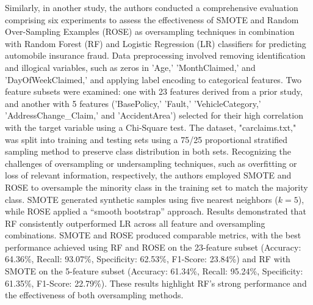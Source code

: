 \documentclass[twoside,11pt]{article}
\begin{document}
Similarly, in another study, the authors \cite{Salmi2022} conducted a comprehensive evaluation comprising six experiments to assess the effectiveness of SMOTE and Random Over-Sampling Examples (ROSE) as oversampling techniques in combination with Random Forest (RF) and Logistic Regression (LR) classifiers for predicting automobile insurance fraud. Data preprocessing involved removing identification and illogical variables, such as zeros in 'Age,' 'MonthClaimed,' and 'DayOfWeekClaimed,' and applying label encoding to categorical features. Two feature subsets were examined: one with 23 features derived from a prior study, and another with 5 features ('BasePolicy,' 'Fault,' 'VehicleCategory,' 'AddressChange\_Claim,' and 'AccidentArea') selected for their high correlation with the target variable using a Chi-Square test. The dataset, "carclaims.txt," was split into training and testing sets using a 75/25 proportional stratified sampling method to preserve class distribution in both sets. Recognizing the challenges of oversampling or undersampling techniques, such as overfitting or loss of relevant information, respectively, the authors employed SMOTE and ROSE to oversample the minority class in the training set to match the majority class. SMOTE generated synthetic samples using five nearest neighbors (\(k = 5\)), while ROSE applied a “smooth bootstrap” approach. Results demonstrated that RF consistently outperformed LR across all feature and oversampling combinations. SMOTE and ROSE produced comparable metrics, with the best performance achieved using RF and ROSE on the 23-feature subset (Accuracy: 64.36\%, Recall: 93.07\%, Specificity: 62.53\%, F1-Score: 23.84\%) and RF with SMOTE on the 5-feature subset (Accuracy: 61.34\%, Recall: 95.24\%, Specificity: 61.35\%, F1-Score: 22.79\%). These results highlight RF's strong performance and the effectiveness of both oversampling methods.
\end{document}
